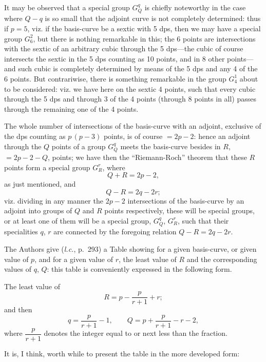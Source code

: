 \documentclass[11pt,a4paper]{book}
\begin{document}
It may be observed that a special group $G_Q^q$ is chiefly noteworthy in the case where $Q-q$ is so small that the adjoint curve is not completely determined: thus if $p = 5$, viz. if the basis-curve be a sextic with 5 dps, then we may have a special group $G_6^2$, but there is nothing remarkable in this; the 6 points are intersections with the sextic of an arbitrary cubic through the 5 dps---the cubic of course intersects the sextic in the 5 dps counting as 10 points, and in 8 other points---and such cubic is completely determined by means of the 5 dps and any 4 of the 6 points. But contrariwise, there is something remarkable in the group $G_4^1$ about to be considered: viz. we have here on the sextic 4 points, such that every cubic through the 5 dps and through 3 of the 4 points (through 8 points in all) passes through the remaining one of the 4 points.

The whole number of intersections of the basis-curve with an adjoint, exclusive of the dps counting as $p\,(p-3)$ points, is of course $= 2p-2$: hence an adjoint through the $Q$ points of a group $G_Q^q$ meets the basis-curve besides in $R$, $= 2p-2-Q$, points; we have then the ``Riemann-Roch'' theorem that these $R$ points form a special group $G_R^r$, where
\[
Q + R = 2p - 2,
\]
as just mentioned, and
\[
Q - R = 2q - 2r;
\]
viz. dividing in any manner the $2p-2$ intersections of the basis-curve by an adjoint into groups of $Q$ and $R$ points respectively, these will be special groups, or at least one of them will be a special group, $G_Q^q$, $G_R^r$, such that their specialities $q$, $r$ are connected by the foregoing relation $Q - R = 2q - 2r$.

The Authors give (\textit{l.c.}, p.~293) a Table showing for a given basis-curve, or given value of $p$, and for a given value of $r$, the least value of $R$ and the corresponding values of $q$, $Q$: this table is conveniently expressed in the following form.

The least value of
\[
R = p - \frac{p}{r+1} + r;
\]
and then
\[
q = \frac{p}{r+1} - 1,\qquad Q = p + \frac{p}{r+1} - r - 2,
\]
where $\dfrac{p}{r+1}$ denotes the integer equal to or next less than the fraction.

It is, I think, worth while to present the table in the more developed form:
\end{document}
